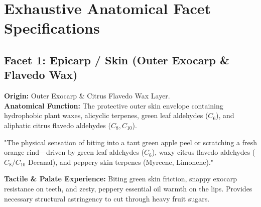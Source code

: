 \documentclass[11pt,a4paper]{article}
\begin{document}
\newpage

\section{Exhaustive Anatomical Facet Specifications}

\subsection{Facet 1: Epicarp / Skin (Outer Exocarp \& Flavedo Wax)}

\begin{botanicalbox}
\textbf{Origin:} Outer Exocarp \& Citrus Flavedo Wax Layer.\\
\textbf{Anatomical Function:} The protective outer skin envelope containing hydrophobic plant waxes, alicyclic terpenes, green leaf aldehydes ($C_6$), and aliphatic citrus flavedo aldehydes ($C_8, C_{10}$).
\end{botanicalbox}

\begin{sensoryquote}
"The physical sensation of biting into a taut green apple peel or scratching a fresh orange rind---driven by green leaf aldehydes ($C_6$), waxy citrus flavedo aldehydes ($C_8/C_{10}$ Decanal), and peppery skin terpenes (Myrcene, Limonene)."
\end{sensoryquote}

\begin{flavourbox}
\textbf{Tactile \& Palate Experience:} Biting green skin friction, snappy exocarp resistance on teeth, and zesty, peppery essential oil warmth on the lips. Provides necessary structural astringency to cut through heavy fruit sugars.
\end{flavourbox}

\begin{table}[htbp]
\centering
\caption{Primary Impact Actors for Facet 1 (Epicarp / Skin)}
\vspace{0.3em}
\end{table}
\end{document}
